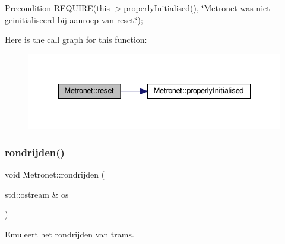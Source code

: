 \begin{DoxyPrecond}{Precondition}
R\+E\+Q\+U\+I\+RE(this-\/$>$\hyperlink{class_metronet_a3d2adce29a947f162924279b766de645}{properly\+Initialised()}, \char`\"{}\+Metronet was niet geinitialiseerd bij aanroep van reset.\char`\"{}); 
\end{DoxyPrecond}
Here is the call graph for this function\+:\nopagebreak
\begin{figure}[H]
\begin{center}
\leavevmode
\includegraphics[width=336pt]{class_metronet_aae72fb7ad05324adb1ccc6a1519c5c0b_cgraph}
\end{center}
\end{figure}
\mbox{\label{class_metronet_a180b666c7d4cc52f873579ab7f95ea35}} 
\subsubsection{\texorpdfstring{rondrijden()}{rondrijden()}}
{\footnotesize\ttfamily void Metronet\+::rondrijden (\begin{DoxyParamCaption}\item[{std\+::ostream \&}]{os }\end{DoxyParamCaption})}



Emuleert het rondrijden van trams. 


